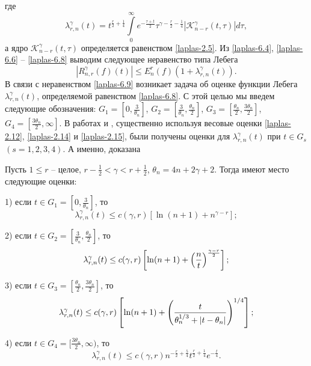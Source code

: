 где
\begin{equation}\label{laplas-6.8}
  \lambda_{r,n}^\gamma(t)=t^{\frac r2+\frac14}\int\limits_0^\infty e^{-\frac{\tau+t}2}\tau^{\gamma-\frac r2-\frac14}|\mathcal{K}_{n-r}^\gamma(t,\tau)|d\tau,
\end{equation}
а ядро $\mathcal{K}_{n-r}^\gamma(t,\tau)$ определяется равенством \eqref{laplas-2.5}.
Из \eqref{laplas-6.4}, \eqref{laplas-6.6} -- \eqref{laplas-6.8} выводим следующее неравенство типа Лебега
\begin{equation}\label{laplas-6.9}
  |R_{n,r}^\gamma(f)(t)|\le E_n^r(f)(1+\lambda_{r,n}^\gamma(t)).
\end{equation}
В связи с неравенством \eqref{laplas-6.9} возникает задача об оценке функции Лебега $\lambda_{r,n}^\gamma(t)$, определяемой равенством \eqref{laplas-6.8}. С этой целью мы введем следующие обозначения: $G_1=[0,\frac3{\theta_n}]$, $G_2=[\frac3{\theta_n},\frac{\theta_n}2]$, $G_3=[\frac{\theta_n}2,\frac{3\theta_n}2]$, $G_4=[\frac{3\theta_n}2,\infty]$. В работах \cite{laplas-Shar11} и \cite{sobleg-SHII}, существенно используя весовые оценки \eqref{laplas-2.12}, \eqref{laplas-2.14} и \eqref{laplas-2.15},  были получены оценки для $\lambda_{r,n}^\gamma(t)$ при $t\in G_s$ $(s=1,2,3,4)$. А именно, доказана

\begin{theorem}
 Пусть $1\le r$ -- целое, $r-\frac12<\gamma< r+\frac12$, $\theta_n=4n+2\gamma+2$. Тогда имеют место следующие оценки:

1) если $t \in G_1=[0,\frac3{\theta_n}]$,  то
\begin{equation}\label{laplas-6.10}
\lambda^\gamma_{r,n}(t) \leq c(\gamma,r)[\ln(n+1)+n^{\gamma-r}];
\end{equation}

2) если $t \in G_2=[\frac3{\theta_n},\frac{\theta_n}2]$, то
\begin{equation}
\lambda_{r,n}^\gamma(t) \leq c(\gamma,r)\left[\ln(n+1)+\left({n\over t}\right)^{\gamma-r\over2}\right];
\label{laplas-6.11}
\end{equation}

3) если $t \in G_3=[\frac{\theta_n}2,\frac{3\theta_n}2]$, то
\begin{equation}
\lambda_{r,n}^\gamma(t) \leq c(\gamma,r)\left[\ln(n+1)+\left({t\over \theta_n^{1/3}+|t-\theta_n| }\right)^{1/4}\right];
\label{laplas-6.12}
\end{equation}

4) если $t \in G_4=[\frac{3\theta_n}2,\infty)$, то
\begin{equation}
\lambda_{r,n}^\gamma(t) \leq c(\gamma,r)n^{-\frac{r}{2}+\frac54}t^{\frac r2+\frac14}e^{-\frac{t}{4}}.
\label{laplas-6.13}
\end{equation}

\end{theorem} 